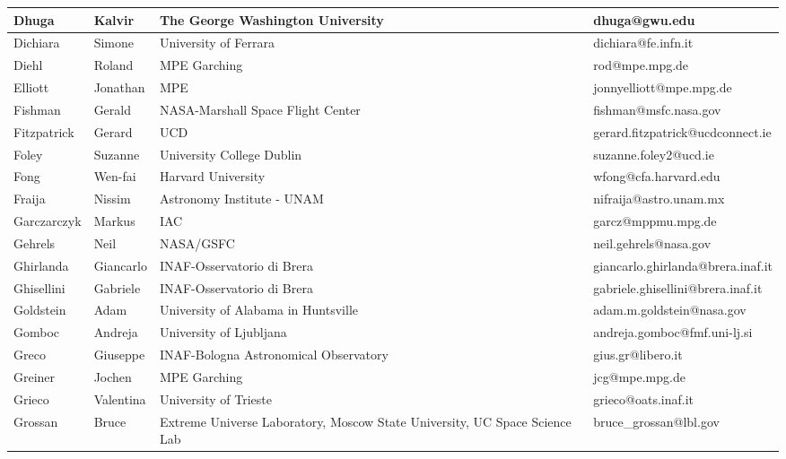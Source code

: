 \begin{center}
\begin{longtable}{|p{1.28cm} |p{1.28cm} |p{2.9cm} |p{3cm} |}
\tiny Dhuga &\tiny Kalvir & \tiny The George Washington University & \tiny dhuga@gwu.edu \\ \hline
\tiny Dichiara &\tiny Simone & \tiny University of Ferrara & \tiny dichiara@fe.infn.it \\ \hline
\tiny Diehl &\tiny Roland & \tiny MPE Garching & \tiny rod@mpe.mpg.de \\ \hline
\tiny Elliott &\tiny Jonathan & \tiny MPE & \tiny jonnyelliott@mpe.mpg.de \\ \hline
\tiny Fishman &\tiny Gerald & \tiny NASA-Marshall Space Flight Center & \tiny fishman@msfc.nasa.gov \\ \hline
\tiny Fitzpatrick &\tiny Gerard & \tiny UCD & \tiny gerard.fitzpatrick@ucdconnect.ie \\ \hline
\tiny Foley &\tiny Suzanne & \tiny University College Dublin & \tiny suzanne.foley2@ucd.ie \\ \hline
\tiny Fong &\tiny Wen-fai & \tiny Harvard University & \tiny wfong@cfa.harvard.edu \\ \hline
\tiny Fraija &\tiny Nissim & \tiny Astronomy Institute - UNAM & \tiny nifraija@astro.unam.mx \\ \hline
\tiny Garczarczyk &\tiny Markus & \tiny IAC & \tiny garcz@mppmu.mpg.de \\ \hline
\tiny Gehrels &\tiny Neil & \tiny NASA/GSFC & \tiny neil.gehrels@nasa.gov \\ \hline
\tiny Ghirlanda &\tiny Giancarlo & \tiny INAF-Osservatorio di Brera & \tiny giancarlo.ghirlanda@brera.inaf.it \\ \hline
\tiny Ghisellini &\tiny Gabriele & \tiny INAF-Osservatorio di Brera & \tiny gabriele.ghisellini@brera.inaf.it \\ \hline
\tiny Goldstein &\tiny Adam & \tiny University of Alabama in Huntsville & \tiny adam.m.goldstein@nasa.gov \\ \hline
\tiny Gomboc &\tiny Andreja & \tiny University of Ljubljana & \tiny andreja.gomboc@fmf.uni-lj.si \\ \hline
\tiny Greco &\tiny Giuseppe & \tiny INAF-Bologna Astronomical Observatory & \tiny gius.gr@libero.it \\ \hline
\tiny Greiner &\tiny Jochen & \tiny MPE Garching & \tiny jcg@mpe.mpg.de \\ \hline
\tiny Grieco &\tiny Valentina & \tiny University of Trieste & \tiny grieco@oats.inaf.it \\ \hline
\tiny Grossan &\tiny Bruce & \tiny Extreme Universe Laboratory, Moscow State University, UC Space Science Lab & \tiny bruce\_grossan@lbl.gov \\ \hline

\end{longtable}
\end{center}
